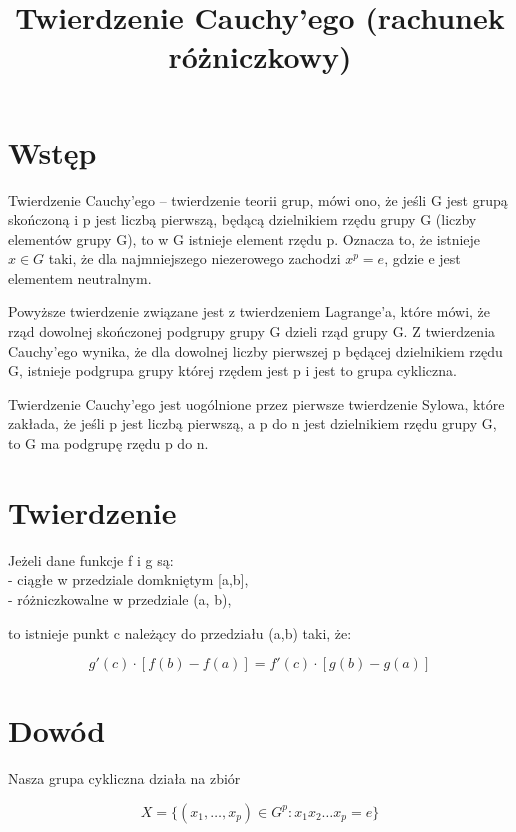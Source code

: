 \documentclass{article}
\begin{document}
\title{Twierdzenie Cauchy’ego (rachunek różniczkowy)}
\maketitle

\section*{Wstęp}
Twierdzenie Cauchy’ego – twierdzenie teorii grup, mówi ono, że jeśli G jest grupą skończoną i p jest liczbą pierwszą, będącą dzielnikiem rzędu grupy G (liczby elementów grupy G), to w G istnieje element rzędu p. Oznacza to, że istnieje \(x\in G\) taki, że dla najmniejszego niezerowego zachodzi $x^p = e$, gdzie e jest elementem neutralnym.

Powyższe twierdzenie związane jest z twierdzeniem Lagrange’a, które mówi, że rząd dowolnej skończonej podgrupy grupy G dzieli rząd grupy G. Z twierdzenia Cauchy’ego wynika, że dla dowolnej liczby pierwszej p będącej dzielnikiem rzędu G, istnieje podgrupa grupy której rzędem jest p i jest to grupa cykliczna.

Twierdzenie Cauchy’ego jest uogólnione przez pierwsze twierdzenie Sylowa, które zakłada, że jeśli p jest liczbą pierwszą, a p do n jest dzielnikiem rzędu grupy G, to G ma podgrupę rzędu p do n.


\section*{Twierdzenie}

Jeżeli dane funkcje f i g są: \\
- ciągłe w przedziale domkniętym [a,b], \\
- różniczkowalne w przedziale (a, b),

to istnieje punkt c należący do przedziału (a,b) taki, że: 

\begin{equation}
	g'(c)\cdot \left[f(b)-f(a)\right]=f'(c)\cdot \left[g(b)-g(a)\right]
\end{equation}



\section*{Dowód}

Nasza grupa cykliczna działa na zbiór 

\begin{equation*}
	X=\{(x_{1},\dots ,x_{p})\in G^{p}:x_{1}x_{2}\ldots x_{p}=e\}
\end{equation*} 
\end{document}
